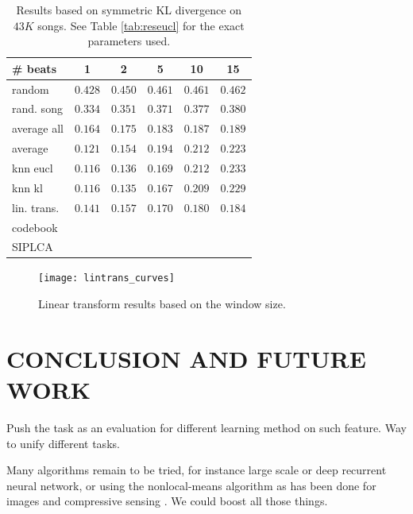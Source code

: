 \documentclass{article}
\begin{document}
\begin{table}[t]
\begin{small}
\begin{center}
\begin{tabular}{l|c|c|c|c|c|}
\# beats & 1 & 2 & 5 & 10 & 15 \\ \hline \hline
random & $0.428$ & $0.450$ & $0.461$ & $0.461$ & $0.462$  \\
rand. song & $0.334$ & $0.351$ & $0.371$ & $0.377$ & $0.380$  \\
average all & $0.164$ & $0.175$ & $0.183$ & $0.187$ & $0.189$ \\ 
average & $0.121$ & $0.154$ & $0.194$ & $0.212$ &  $0.223$ \\ \hline
knn eucl & $\mathbf{0.116}$ & $0.136$ & $0.169$ & $0.212$ & $0.233$ \\
knn kl & $\mathbf{0.116}$ & $\mathbf{0.135}$ & $\mathbf{0.167}$ & $0.209$ & $0.229$ \\
lin. trans. & $0.141$ & $0.157$ & $0.170$ & $\mathbf{0.180}$ & $\mathbf{0.184}$ \\
codebook & & & & &  \\
SIPLCA & & & & &  \\ \hline
\end{tabular}
\caption{Results based on symmetric KL divergence on $43K$ songs.
See Table \ref{tab:reseucl} for the exact parameters used.}
\label{tab:reskl}
\end{center}
\end{small}
\end{table}

\begin{figure}[t]
\begin{center}
\texttt{[image: lintrans\_curves]}
\end{center}
\caption{Linear transform results based on the window size.}
\label{fig:lintrans}
\end{figure}


\section{CONCLUSION AND FUTURE WORK}
\label{sec:conclusion}
Push the task as an evaluation for different learning method on such feature.
Way to unify different tasks.

Many algorithms remain to be tried, for instance large scale or deep recurrent
neural network, or using the nonlocal-means algorithm as has been done for
images \cite{Buades2005} and compressive sensing \cite{Gemmeke2008}.
We could boost all those things.
\end{document}
